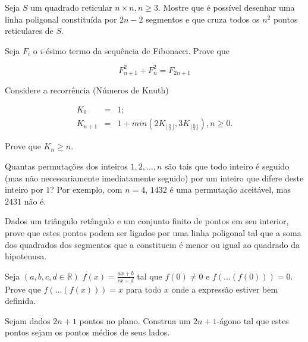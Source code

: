 \begin{questao}
  Seja $S$ um quadrado reticular $n \times n, n \geq 3$. Mostre que é possível
  desenhar uma linha poligonal constituída por $2n-2$ segmentos e que cruza
  todos os $n^2$ pontos reticulares de $S$.
\end{questao}

\begin{questao}
  Seja $F_i$ o $i$-ésimo termo da sequência de Fibonacci. Prove que

  $$ F^2_{n+1} + F^2_{n} = F_{2n+1} $$
\end{questao}

\begin{questao}
  Considere a recorrência (Números de Knuth)

  \begin{eqnarray*}
    K_0 & = & 1;\\ K_{n+1} & = & 1 + min(2K_{\lfloor\frac{n}{2}\rfloor},
    3K_{\lfloor\frac{n}{3}\rfloor}), n \geq 0.
  \end{eqnarray*}

  Prove que $K_n \geq n$.
\end{questao}

\begin{questao}
  Quantas permutações dos inteiros $1,2,\ldots,n$ são tais que todo inteiro é
  seguido (mas não necessariamente imediatamente seguido) por um inteiro que
  difere deste inteiro por $1$? Por exemplo, com $n=4$, $1432$ é uma permutação
  aceitável, mas $2431$ não é.
\end{questao}

\begin{questao}
  Dados um triângulo retângulo e um conjunto finito de pontos em seu interior,
  prove que estes pontos podem ser ligados por uma linha poligonal tal que a
  soma dos quadrados dos segmentos que a constituem é menor ou igual ao quadrado
  da hipotenusa.
\end{questao}

\begin{questao}
  Seja $(a,b,c,d \in \mathbb{R})$ $f(x) = \frac{ax+b}{cx+d}$ tal que $f(0) \not
  = 0$ e $f(\ldots(f(0))) = 0$.  Prove que $f(\ldots(f(x))) = x$ para todo $x$
  onde a expressão estiver bem definida.
\end{questao}

\begin{questao}
  Sejam dados $2n+1$ pontos no plano. Construa um $2n+1$-ágono tal que estes
  pontos sejam os pontos médios de seus lados.
\end{questao}

